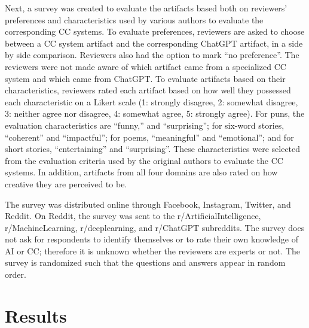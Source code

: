 \documentclass[phd,electronic,oneside,twosidetoc,letterpaper,chaptercenter,parttop,lof]{byumsphd}
\begin{document}
Next, a survey was created to evaluate the artifacts based both on reviewers' preferences and characteristics used by various authors to evaluate the corresponding CC systems. 
To evaluate preferences, reviewers are asked to choose between a CC system artifact and the corresponding ChatGPT artifact, in a side by side comparison. 
Reviewers also had the option to mark ``no preference''.
The reviewers were not made aware of which artifact came from a specialized CC system and which came from ChatGPT. 
To evaluate artifacts based on their characteristics, reviewers rated each artifact based on how well they possessed each characteristic on a Likert scale (1: strongly disagree, 2: somewhat disagree, 3: neither agree nor disagree, 4: somewhat agree, 5: strongly agree). For puns, the evaluation characteristics are ``funny,'' and ``surprising''; for six-word stories, ``coherent'' and ``impactful''; for poems, ``meaningful'' and ``emotional''; and for short stories, ``entertaining'' and ``surprising''.
These characteristics were selected from the evaluation criteria used by the original authors to evaluate the CC systems.  In addition, artifacts from all four domains are also rated on how creative they are perceived to be.

The survey was distributed online through Facebook, Instagram, Twitter, and Reddit.
On Reddit, the survey was sent to the r/ArtificialIntelligence, r/MachineLearning, r/deeplearning, and r/ChatGPT subreddits.
The survey does not ask for respondents to identify themselves or to rate their own knowledge of AI or CC; therefore it is unknown whether the reviewers are experts or not.
The survey is randomized such that the questions and answers appear in random order.

\section{Results}
\end{document}
